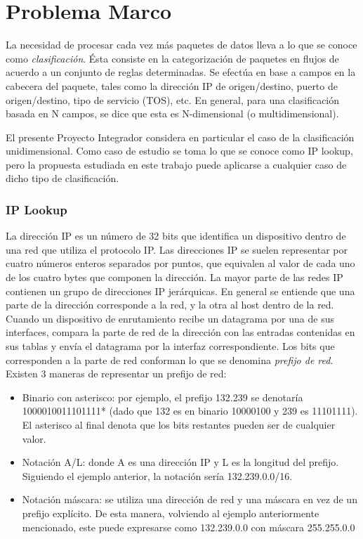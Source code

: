      




\section{Problema Marco}

La necesidad de procesar cada vez más paquetes de datos lleva a lo que se conoce como \textit{clasificación}. Ésta consiste en la categorización de paquetes en flujos de acuerdo a un conjunto de reglas determinadas. Se efectúa en base a campos en la cabecera del paquete, tales como la dirección IP de origen/destino, puerto de origen/destino, tipo de servicio (TOS), etc. En general, para una clasificación basada en N campos, se dice que esta es N-dimensional (o multidimensional).

El presente Proyecto Integrador considera en particular el caso de la clasificación unidimensional. Como caso de estudio se toma lo que se conoce como IP lookup, pero la propuesta estudiada en este trabajo puede aplicarse a cualquier caso de dicho tipo de clasificación.

\subsubsection{IP Lookup}

La dirección IP es un número de 32 bits que identifica un dispositivo dentro de una red que utiliza el protocolo IP. Las direcciones IP se suelen representar por cuatro números enteros separados por puntos, que equivalen al valor de cada uno de los cuatro bytes que componen la dirección.
La mayor parte de las redes IP contienen un grupo de direcciones IP jerárquicas. En general se entiende que una parte de la dirección corresponde a la red, y la otra al host dentro de la red. Cuando un dispositivo de enrutamiento recibe un datagrama por una de sus interfaces, compara la parte de red de la dirección con las entradas contenidas en sus tablas y envía el datagrama por la interfaz correspondiente.
Los bits que corresponden a la parte de red conforman lo que se denomina \textit{prefijo de red}.
Existen 3 maneras de representar un prefijo de red:

\begin{itemize}
	\item Binario con asterisco: por ejemplo, el prefijo 132.239 se denotaría 1000010011101111* (dado que 132 es en binario 10000100 y 239 es 11101111). El asterisco al final denota que los bits restantes pueden ser de cualquier valor.
	\item Notación A/L: donde A es una dirección IP y L es la longitud del prefijo. Siguiendo el ejemplo anterior, la notación sería 132.239.0.0/16.
	\item Notación máscara: se utiliza una dirección de red y una máscara en vez de un prefijo explícito. De esta manera, volviendo al ejemplo anteriormente mencionado, este puede expresarse como 132.239.0.0 con máscara 255.255.0.0
\end{itemize}


